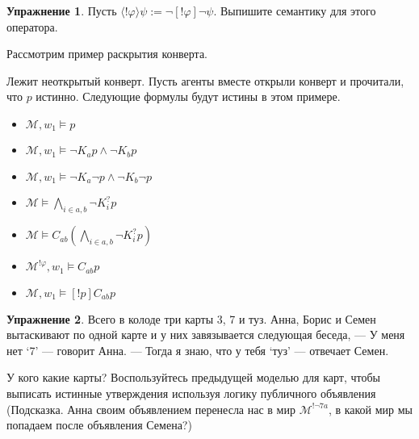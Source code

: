 \documentclass[openany]{book}
\theoremstyle{plain}
\theoremstyle{definition}
\newtheorem{xrc}{Упражнение}[]
\begin{document}
\begin{xrc}
    Пусть \(\langle ! \varphi \rangle \psi := \neg [!\varphi] \neg \psi\). Выпишите семантику для этого оператора.
\end{xrc}

Рассмотрим пример раскрытия конверта.

\begin{figure}
    \centering
\end{figure}

Лежит неоткрытый конверт. Пусть агенты вместе открыли конверт и прочитали, что \(p\) истинно. Следующие формулы будут истины в этом примере. 
\begin{itemize}
    \item \(\mathcal{M}, w_1 \models p\)
    \item \(\mathcal{M}, w_1 \models \neg K_a p \land \neg K_b p\)
    \item \(\mathcal{M}, w_1 \models \neg K_a \neg p \land \neg K_b \neg p\)
    \item \(\mathcal{M} \models \bigwedge\limits_{i\in{a,b}} \neg K_i^? p\)
    \item \(\mathcal{M} \models C_{ab} \left(\bigwedge\limits_{i \in {a,b}} \neg K_i^? p \right)\)
    \item \(\mathcal{M}^{!\varphi}, w_1 \models C_{ab} p\)
    \item \(\mathcal{M}, w_1 \models [!p] C_{ab} p\)
\end{itemize}

\begin{xrc}
    Всего в колоде три карты 3, 7 и туз. Анна, Борис и Семен вытаскивают по одной карте и у них завязывается следующая беседа,
    --- У меня нет `7' --- говорит Анна.
    --- Тогда я знаю, что у тебя `туз' --- отвечает Семен.

    У кого какие карты? Воспользуйтесь предыдущей моделью для карт, чтобы выписать истинные утверждения используя логику публичного объявления (Подсказка. Анна своим объявлением перенесла нас в мир \(\mathcal{M}^{! \neg 7a}\), в какой мир мы попадаем после объявления Семена?)
\end{xrc}
\end{document}
